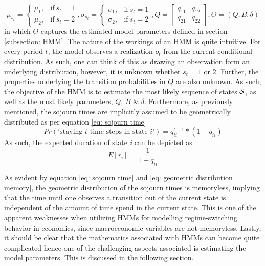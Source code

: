 $$
    \mu_{s_t}=
    \begin{cases}
        \mu_1, & \text{if}\ s_t = 1 \\
        \mu_2, & \text{if}\ s_t = 2
    \end{cases},
    \sigma_{s_t} =
    \begin{cases}
        \sigma_1, & \text{if}\ s_t = 1 \\
        \sigma_2, & \text{if}\ s_t = 2
    \end{cases},
    Q = 
    \begin{bmatrix}
    q_{11} & q_{12} \\
    q_{21} & q_{22}
    \end{bmatrix},
    \Theta = (Q, B, \delta)
$$
in which $\Theta$ captures the estimated model parameters defined in section \ref{subsection: HMM}. The nature of the workings of an HMM is quite intuitive. For every period $t$, the model observes a realization $o_t$ from the current conditional distribution. As such, one can think of this as drawing an observation form an underlying distribution, however, it is unknown whether $s_t = 1$ or $2$. Further, the properties underlying the transition probabilities in $Q$ are also unknown. As such, the objective of the HMM is to estimate the most likely sequence of states $\S$, as well as the most likely parameters, $Q$, $B$ \& $\delta$. Furthermore, as previously mentioned, the sojourn times are implicitly assumed to be geometrically distributed as per equation \ref{eq: sojourn time}
\begin{equation}
    Pr('\text{staying $t$ time steps in state $i$'}) = q^{t-1}_{ii} *(1-q_{ii})
    \label{eq: sojourn time}
\end{equation}
As such, the expected duration of state \textit{i} can be depicted as 
\begin{equation}
    E[r_i] = \frac{1}{1-q_{ii}}
    \label{eq: geometric distribution memory}
\end{equation}

As evident by equation \ref{eq: sojourn time} and \ref{eq: geometric distribution memory}, the geometric distribution of the sojourn times is memoryless, implying that the time until one observes a transition out of the current state is independent of the amount of time spend in the current state. This is one of the apparent weaknesses when utilizing HMMs for modelling regime-switching behavior in economics, since macroeconomic variables are not memoryless. Lastly, it should be clear that the mathematics associated with HMMs can become quite complicated hence one of the challenging aspects associated is estimating the model parameters. This is discussed in the following section.

